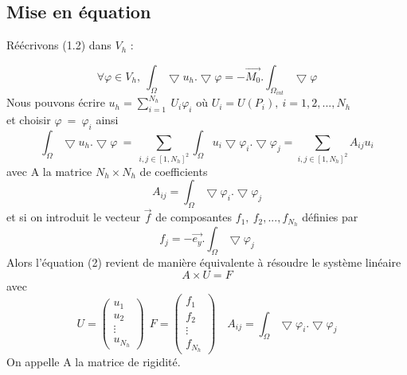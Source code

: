 \documentclass[a4paper,12pt,titlepage]{report}
\begin{document}
\begin{onehalfspace}
\subsection{Mise en équation}

Réécrivons (1.2) dans $V_{h}$ : 

\[
	\forall \varphi \in V_{h} , \ \int_{\Omega}\bigtriangledown u_{h}. \bigtriangledown \varphi = -\vec{M_{0}}. \int_{\Omega_{int}}\bigtriangledown \varphi
\]
Nous pouvons écrire $u_{h} = \sum_{i=1}^{N_{h}}{\ U_{i}\varphi_{i}} \text{ \ \ où } U_{i} = U(P_{i}),\  i= 1,2,...,N_{h}$ \\ et choisir $\varphi\ =\ \varphi_{i}$
ainsi
\[
	\int_{\Omega}\bigtriangledown u_{h}.\bigtriangledown \varphi\ 
	=\ 
	\sum_{i, j \in [1, N_{h}]^{2}} \int_{\Omega}u_{i}\bigtriangledown\varphi_{i}. \bigtriangledown\varphi_{j} 
	= 
	\sum_{i,j \in [1, N_{h}]^{2}} A_{ij} u_{i}
\]
avec A la matrice $N_{h} \times N_{h}$ de coefficients
\[
A_{ij}  = \int_{\Omega}\bigtriangledown\varphi_{i}.\bigtriangledown\varphi_{j}
\]
et si on introduit le vecteur $\vec{f}$ de composantes $f_{1},\ f_{2},..., f_{N_{h}}$ définies par
\[
f_{j} =  -\vec{e_{y}}.\int_{\Omega} \bigtriangledown\varphi_{j}
\]
Alors l'équation (2) revient de manière équivalente à résoudre le système linéaire 
\[
	A \times U =F
\]
 avec 
\[
U = 
\begin{pmatrix}
   u_{1} \\
   u_{2} \\
   \vdots \\
   u_{N_{h}}
\end{pmatrix}
\ \ F = 
\begin{pmatrix}
   f_{1} \\
   f_{2} \\
   \vdots \\
   f_{N_{h}}
\end{pmatrix}
\quad
A_{ij}  = \int_{\Omega}\bigtriangledown \varphi_{i}. \bigtriangledown \varphi_{j}
\]
On appelle A la matrice de rigidité.  \\

\newpage

\end{onehalfspace}
\end{document}

